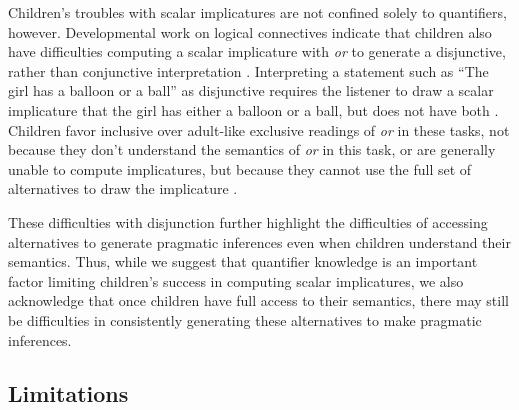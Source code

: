 \documentclass[man]{apa2}
\begin{document}
{Children's troubles with scalar implicatures are not confined solely to quantifiers, however. Developmental work on logical connectives indicate that children also have difficulties computing a scalar implicature with \emph{or} to generate a disjunctive, rather than conjunctive interpretation \cite{singh2016,tieu2016,zhou2013}. Interpreting a statement such as ``The girl has a balloon or a ball'' as disjunctive requires the listener to draw a scalar implicature that the girl has either a balloon or a ball, but does not have both \cite{singh2016}. Children favor inclusive over adult-like exclusive readings of \emph{or} in these tasks, not because they don't understand the semantics of \emph{or} in this task, or are generally unable to compute implicatures, but because they cannot use the full set of alternatives to draw the implicature \cite{singh2016,tieu2016,zhou2013}.

These difficulties with disjunction further highlight the difficulties of accessing alternatives to generate pragmatic inferences even when children understand their semantics. Thus, while we suggest that quantifier knowledge is an important factor limiting children's success in computing scalar implicatures, we also acknowledge that once children have full access to their semantics, there may still be difficulties in consistently generating these alternatives to make pragmatic inferences.



\subsection{Limitations}

}
\end{document}
